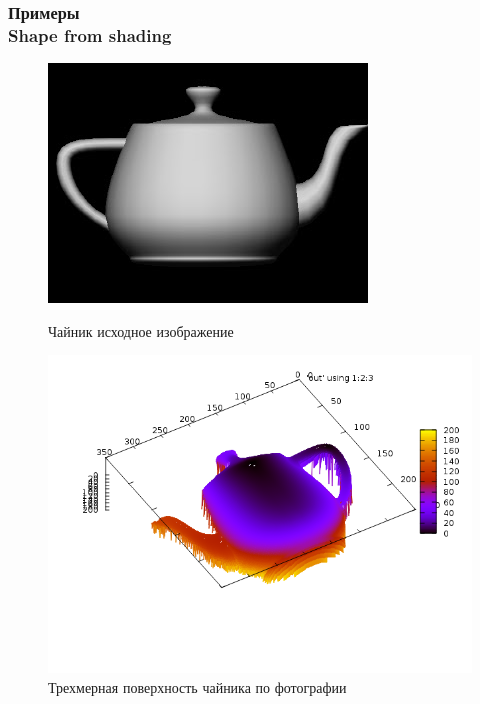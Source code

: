 \documentclass[hyperref={unicode=true},professionalfont]{beamer}
\newcommand{\stamp}{
	\begin{frame}[plain,noframenumbering]
		\begin{table}[h!]
			\flushright
			\vspace{5cm}
			\begin{adjustbox}{max width=0.7\textwidth}
				\begin{tabular}{
					|>{\footnotesize}p{0.8cm}|
					>{\footnotesize}p{0.8cm}|
					>{\footnotesize}p{2.2cm}|
					>{\footnotesize}p{1.1cm}|
					>{\footnotesize}p{0.8cm}|
					>{\footnotesize}p{5cm}|
					>{\footnotesize}p{0.1cm}|
					>{\footnotesize}p{0.1cm}|
					>{\footnotesize}p{0.1cm}|
					>{\footnotesize}p{0.8cm}|
					>{\footnotesize}p{1.4cm}|
				}
					\hline
					&&&&& \multicolumn{6}{>{\footnotesize}c|}{\multirow{3}{*}{\Large 0.043.00.00 ПЗ}} \\ \cline{1-5}
					&&&&& \multicolumn{6}{>{\footnotesize}c|}{} \\ \cline{1-5}
					Изм. & Лист & № Документа & Подпись & Дата & \multicolumn{6}{>{\footnotesize}c|}{} \\ \hline
					\multicolumn{2}{|>{\footnotesize}l|}{Разработал}
                    & Апанович Д.В. &  &  &
                                            \multirow{4}{5cm}{\centering
                                            Параллельный алгоритм
                                            численного решения
                                            анизотропного уравнения эйконала} & \multicolumn{3}{>{\footnotesize}l|}{Лит.} & Лист & Листов \\ \cline{1-5}\cline{7-11}
					\multicolumn{2}{|>{\footnotesize}l|}{Проверил}
                    & Казаков А.Л. &  &  &  & У & & & \insertframenumber & \inserttotalframenumber \\ \cline{1-5}\cline{7-11}
					\multicolumn{2}{|>{\footnotesize}l|}{Нормоконтролер}
                    & Казаков А.Л. &  &  &  & \multicolumn{5}{>{\footnotesize}l|}{} \\ \cline{1-5}
					\multicolumn{2}{|>{\footnotesize}l|}{} &  &  &  &  & \multicolumn{5}{>{\footnotesize}l|}{Кафедра АС, гр. ИСТм-16-1} \\ \cline{1-5}
					\multicolumn{2}{|>{\footnotesize}l|}{Утвердил}
                    & Бахвалов С.В. &  &  &  & \multicolumn{5}{>{\footnotesize}l|}{} \\ \hline

				\end{tabular}
			\end{adjustbox}
		\end{table}

	\end{frame}
}
\renewcommand{\stamp}{}
\begin{document}
\begin{frame}
  \frametitle{Примеры \\ Shape from shading}

  \begin{figure}[ht]
    \begin{minipage}[h]{0.49\linewidth}
      \centering
      \includegraphics[width=0.9\linewidth]{teapot_in.jpg}
      \hfil \caption{Чайник исходное изображение}
      \label{fig:ex:1:in}

    \end{minipage}
    \begin{minipage}[ht]{0.49\linewidth}
      \centering
      \includegraphics[width=0.9\linewidth]{teapot.png}
      \hfil \caption{Трехмерная поверхность чайника по фотографии}
      \label{fig:ex:1:out}

    \end{minipage}
  \end{figure}

\end{frame}
\stamp
\end{document}

